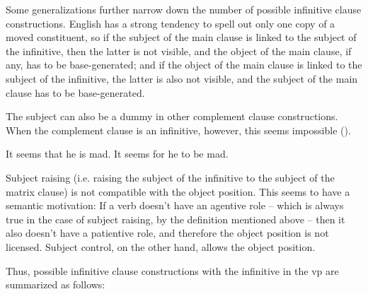 \documentclass[UTF8, a4paper, oneside, scheme=plain]{ctexrep}
\begin{document}
Some generalizations further narrow down 
the number of possible infinitive clause constructions.
English has a strong tendency to spell out only one copy of a moved constituent,
so if the subject of the main clause is linked to the subject of the infinitive,
then the latter is not visible,
and the object of the main clause, if any, has to be base-generated;
and if the object of the main clause is linked to the subject of the infinitive,
the latter is also not visible,
and the subject of the main clause has to be base-generated.

The subject can also be a dummy in other complement clause constructions.
When the complement clause is an infinitive, however, 
this seems impossible ().

\begin{exe}
    \ex\label{ex:complement.infinitive.no-dummy-subject}  \begin{xlist}
        \ex It seems that he is mad.
        \ex *It seems for he to be mad.
    \end{xlist}
\end{exe}

Subject raising (i.e. raising the subject of the infinitive to the subject of the matrix clause) 
is not compatible with the object position.
This seems to have a semantic motivation:
If a verb doesn't have an agentive role -- 
which is always true in the case of subject raising,
by the definition mentioned above -- 
then it also doesn't have a patientive role,
and therefore the object position is not licensed.
Subject control, on the other hand, allows the object position.

Thus, possible infinitive clause constructions with 
the infinitive in the \acs{vp} are summarized as follows:
\end{document}
